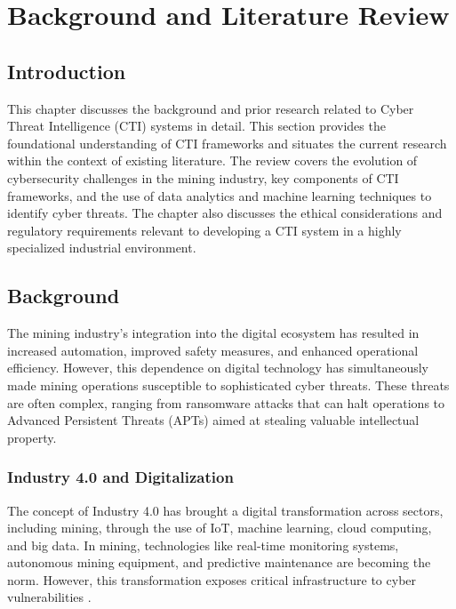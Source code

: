 \documentclass[a4paper,twoside,12pt]{report}
\begin{document}

\chapter{Background and Literature Review}

\section{Introduction}
This chapter discusses the background and prior research related to Cyber Threat Intelligence (CTI) systems in detail. This section provides the foundational understanding of CTI frameworks and situates the current research within the context of existing literature. The review covers the evolution of cybersecurity challenges in the mining industry, key components of CTI frameworks, and the use of data analytics and machine learning techniques to identify cyber threats. The chapter also discusses the ethical considerations and regulatory requirements relevant to developing a CTI system in a highly specialized industrial environment.

\section{Background}
The mining industry's integration into the digital ecosystem has resulted in increased automation, improved safety measures, and enhanced operational efficiency. However, this dependence on digital technology has simultaneously made mining operations susceptible to sophisticated cyber threats. These threats are often complex, ranging from ransomware attacks that can halt operations to Advanced Persistent Threats (APTs) aimed at stealing valuable intellectual property.

\subsection*{Industry 4.0 and Digitalization}
The concept of Industry 4.0 has brought a digital transformation across sectors, including mining, through the use of IoT, machine learning, cloud computing, and big data. In mining, technologies like real-time monitoring systems, autonomous mining equipment, and predictive maintenance are becoming the norm. However, this transformation exposes critical infrastructure to cyber vulnerabilities \citep{wang2013cyber, sajid2016cloud}.
\end{document}
